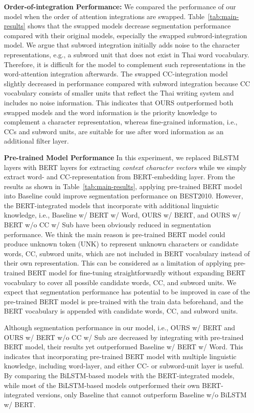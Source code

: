 \medskip\noindent\textbf{Order-of-integration Performance:}
We compared the performance of our model when the order of attention integrations are swapped.
% 
Table~\ref{tab:main-results} shows that the swapped models decrease segmentation performance compared with their original models, especially the swapped subword-integration model.
%
We argue that subword integration initially adds noise to the character representations, e.g., a subword unit that does not exist in Thai word vocabulary.
%
Therefore, it is difficult for the model to complement such representations in the word-attention integration afterwards. 
%
The swapped CC-integration model slightly decreased in performance compared with subword integration because CC vocabulary consists of smaller units that reflect the Thai writing system and includes no noise information.
%
This indicates that OURS outperformed both swapped models and the word information is the priority knowledge to complement a character representation, whereas fine-grained information, i.e., CCs and subword units, are suitable for use after word information as an additional filter layer.


\noindent\textbf{Pre-trained Model Performance}
In this experiment, we replaced BiLSTM layers with BERT layers for extracting \textit{context character vectors} while we simply extract word- and CC-representation from BERT-embedding layer. 
%
From the results as shown in Table~\ref{tab:main-results}, applying pre-trained BERT model into Baseline could improve segmentation performance on BEST2010.
%
However, the BERT-integrated models that incorporate with additional linguistic knowledge, i.e., Baseline w/ BERT w/ Word, OURS w/ BERT, and OURS w/ BERT w/o CC w/ Sub have been obviously reduced in segmentation performance.
%
We think the main reason is pre-trained BERT model could produce unknown token (UNK) to represent unknown characters or candidate words, CC, subword units, which are not included in BERT vocabulary instead of their own representation. 
%
This can be considered as a limitation of applying pre-trained BERT model for fine-tuning straightforwardly without expanding BERT vocabulary to cover all possible candidate words, CC, and subword units.
%
We expect that segmentation performance has potential to be improved in case of the pre-trained BERT model is pre-trained with the train data beforehand, and the BERT vocabulary is appended with candidate words, CC, and subword units.

Although segmentation performance in our model, i.e., OURS w/ BERT and OURS w/ BERT w/o CC w/ Sub are decreased by integrating with pre-trained BERT model, their results yet outperformed Baseline w/ BERT w/ Word. 
%
This indicates that incorporating pre-trained BERT model with multiple linguistic knowledge, including word-layer, and either CC- or subword-unit layer is useful.
%
By comparing the BiLSTM-based models with the BERT-integrated models, while most of the BiLSTM-based models outperformed their own BERT-integrated versions, only Baseline that cannot outperform Baseline w/o BiLSTM w/ BERT. 


